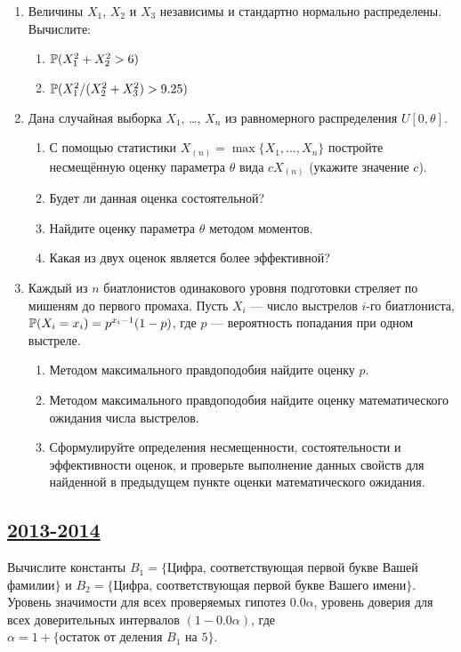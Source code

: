 \begin{enumerate}
\item Величины $X_1$, $X_2$ и $X_3$  независимы и стандартно нормально распределены.
Вычислите:
\begin{enumerate}
\item $\P(X_1^2 + X_2^2 > 6)$
\item $\P(X_1^2 / (X_2^2 + X_3^2) > 9.25 )$
\end{enumerate}

\item Дана случайная выборка $X_1$, \ldots, $X_n$ из равномерного распределения
$U[0, \theta]$.
\begin{enumerate}
\item С помощью статистики $X_{(n)}=\max\{X_1, \ldots, X_n \}$ постройте несмещённую
оценку параметра $\theta$  вида $cX_{(n)}$ (укажите значение $c$).
\item Будет ли данная оценка состоятельной?
\item Найдите оценку параметра $\theta$ методом моментов.
\item Какая из двух оценок является более эффективной?
\end{enumerate}

\item Каждый из $n$ биатлонистов одинакового уровня подготовки стреляет по мишеням
до первого промаха.  Пусть $X_i$ — число выстрелов $i$-го биатлониста,
$\P(X_i = x_i)=p^{x_i-1}(1-p)$, где $p$ — вероятность попадания при одном выстреле.
\begin{enumerate}
\item Методом максимального правдоподобия найдите оценку $p$.
\item Методом максимального правдоподобия найдите оценку математического ожидания
числа выстрелов.
\item Сформулируйте определения несмещенности, состоятельности и эффективности
оценок, и проверьте выполнение данных свойств для найденной в предыдущем пункте
оценки математического ожидания.
\end{enumerate}
\end{enumerate}


\newpage
\subsection[2013-2014]{\hyperref[sec:sol_kr_03_2013_2014]{2013-2014}}
\label{sec:kr_03_2013_2014}


Вычислите константы $B_1=\{\text{Цифра, соответствующая первой букве}$
Вашей\\ фамилии$\}$ и $B_2=\{\text{Цифра, соответствующая первой букве}$
 Вашего имени$\}$.\\
Уровень значимости для всех проверяемых гипотез $0.0\alpha$, уровень доверия
для всех доверительных интервалов $(1-0.0\alpha)$, где  $\alpha = 1+
\{\text{остаток от деления } B_1 \text{ на }  5\}$.\\

